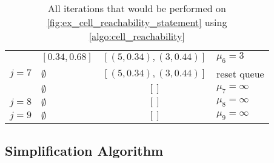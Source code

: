 \begin{table}[htb]
\begin{tabular}{|llcl|}
						& \([0.34, 0.68]\) & \([(5, 0.34), (3, 0.44)]\) & \(\mu_6 = 3\)\\
		\(j=7\) & \(\emptyset\)    & \([(5, 0.34), (3, 0.44)]\) & reset queue\\
		        & \(\emptyset\)    & \([]\) & \(\mu_7 = \infty\)\\
		\(j=8\) & \(\emptyset\)    & \([]\) & \(\mu_8 = \infty\)\\
		\(j=9\) & \(\emptyset\)    & \([]\) & \(\mu_9 = \infty\)\\
		\hline 
  \end{tabular}
	\caption{All iterations that would be performed on \cref{fig:ex_cell_reachability_statement} using \cref{algo:cell_reachability}}
	\label{tab:cell_reachability_execution}
\end{table}






\subsection{Simplification Algorithm}
\label{ssec:simplification_algo_cubic}




